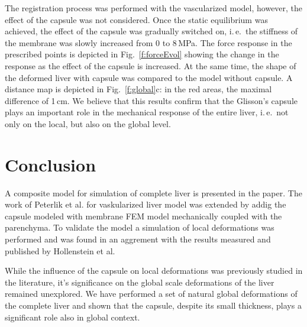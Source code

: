 \documentclass{llncs}
\def\ie{i.\,e.}
\begin{document}
The registration process was performed with the vascularized model, however, the effect of the capsule was 
not considered. Once the static equilibrium was achieved, the effect of the capsule was gradually switched 
on, \ie\ the stiffness of the membrane was slowly increased from 0 to 8\,MPa. The force response in the 
prescribed points is depicted in Fig.~\ref{f:forceEvol} showing the change in the response as the effect
of the capsule is increased. At the same time, the shape of the deformed liver with capsule was compared 
to the model without capsule. A distance map is depicted in Fig.~\ref{f:global}c: in the red areas, the 
maximal difference of 1\,cm. We believe that this results confirm that the Glisson's capsule 
plays an important role in the mechanical response of the entire liver, \ie\ not only on the local, but 
also on the global level.


\section{Conclusion} %

A composite model for simulation of complete liver is presented in the
paper. The work of Peterlik et al. for vaskularized liver model was
extended by addig the capsule modeled with membrane FEM model mechanically
coupled with the parenchyma. To validate the model a simulation of local
deformations was performed and was found in an aggrement with the results
measured and published by Hollenstein et al.

While the influence of the capsule on local deformations was previously
studied in the literature, it's significance on the global scale
deformations of the liver remained unexplored. We have performed a set of
natural global deformations of the complete liver and shown that the
capsule, despite its small thickness, plays a significant role also in
global context.


%
%



\end{document}
